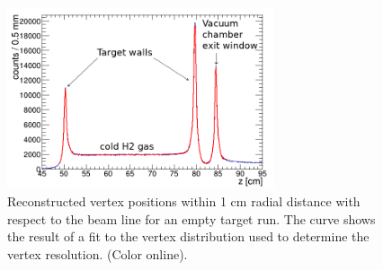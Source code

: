 \begin{figure}[tbp]
\begin{center}
\includegraphics[width=0.7\textwidth]{figures/zvertex.png}  
\caption{\label{fig:z-vertex} Reconstructed vertex positions within 1 cm radial
 distance with respect to the beam line for an empty target run.  The curve shows the result of a fit to the vertex distribution used to determine the vertex
resolution.  (Color online). 
}   
\end{center}  
\end{figure}

